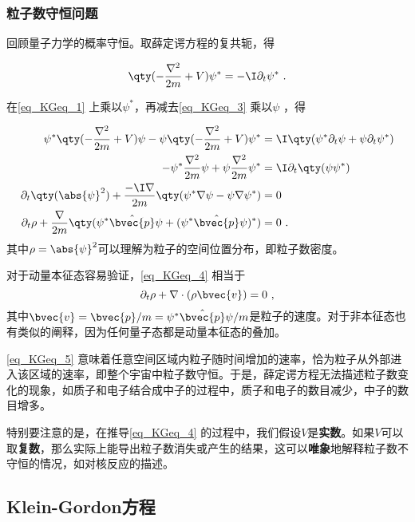 \subsubsection{粒子数守恒问题}

回顾量子力学的概率守恒。取薛定谔方程的复共轭，得

\begin{equation}\label{eq_KGeq_3}
\qty(-\frac{\nabla^2}{2m}+V)\psi^* = -\I \partial_t \psi^*~.
\end{equation}

在\autoref{eq_KGeq_1} 上乘以$\psi^*$，再减去\autoref{eq_KGeq_3} 乘以$\psi$ ，得

\begin{equation}\label{eq_KGeq_4}
\begin{aligned}
\psi^*\qty(-\frac{\nabla^2}{2m}+V)\psi - \psi\qty(-\frac{\nabla^2}{2m}+V)\psi^* &= \I\qty(\psi^*\partial_t\psi + \psi\partial_t\psi^*)\\
-\psi^*\frac{\nabla^2}{2m}\psi + \psi\frac{\nabla^2}{2m}\psi^* &= \I \partial_t\qty(\psi\psi^*)\\
\partial_t\qty(\abs{\psi}^2) + \frac{-\I\nabla}{2m}\qty(\psi^*\nabla\psi-\psi\nabla\psi^*) &= 0\\
\partial_t \rho + \frac{\nabla}{2m} \qty(\psi^*\hat{\bvec{p}}\psi + (\psi^*\hat{\bvec{p}}\psi)^*) &= 0~.
\end{aligned}
\end{equation}
其中$\rho=\abs{\psi}^2$可以理解为粒子的空间位置分布，即粒子数密度。

对于动量本征态容易验证，\autoref{eq_KGeq_4} 相当于
\begin{equation}\label{eq_KGeq_5}
\partial_t\rho + \nabla\cdot(\rho \bvec{v}) = 0~,
\end{equation}
其中$\bvec{v}=\bvec{p}/m=\psi^*\hat{\bvec{p}}\psi/m$是粒子的速度。对于非本征态也有类似的阐释，因为任何量子态都是动量本征态的叠加。

\autoref{eq_KGeq_5} 意味着任意空间区域内粒子随时间增加的速率，恰为粒子从外部进入该区域的速率，即整个宇宙中粒子数守恒。于是，薛定谔方程无法描述粒子数变化的现象，如质子和电子结合成中子的过程中，质子和电子的数目减少，中子的数目增多。

特别要注意的是，在推导\autoref{eq_KGeq_4} 的过程中，我们假设$V$是\textbf{实数}。如果$V$可以取\textbf{复数}，那么实际上能导出粒子数消失或产生的结果，这可以\textbf{唯象}地解释粒子数不守恒的情况，如对核反应的描述。



\subsection{Klein-Gordon方程}


